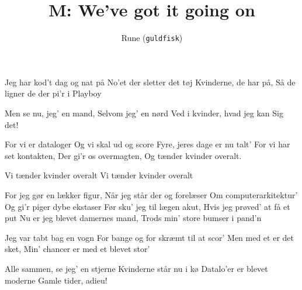 \documentclass[danish]{article}
\title{M: We've got it going on}
\author{Rune (\texttt{guldfisk})}
\begin{document}
\twocolumn[ %
\maketitle
]
\begin{song}

 Jeg har kod't dag og nat på
No'et der sletter det tøj
Kvinderne, de har på,
Så de ligner de der pi'r i Playboy

Men se nu, jeg' en mand,
Selvom jeg' en nørd
Ved i kvinder, hvad jeg kan
Sig det!

For vi er dataloger
Og vi skal ud og score
Fyre, jeres dage er nu talt'
For vi har set kontakten,
Der gi'r os overmagten,
Og tænder kvinder overalt.

Vi tænder kvinder overalt
Vi tænder kvinder overalt

For jeg gør en lækker figur,
Når jeg står der og forelæser
Om computerarkitektur'
Og gi'r piger dybe ekstaser
Før sku' jeg til lægen akut,
Hvis jeg prøved' at få et put
Nu er jeg blevet damernes mand,
Trods min' store bumser i pand'n

Jeg var tabt bag en vogn
For bange og for skræmt til at scor'
Men med et er det sket,
Min' chancer er med et blevet stor'

Alle sammen, se jeg' en stjerne
Kvinderne står nu i kø
Datalo'er er blevet moderne
Gamle tider, adieu!

\end{song}
\end{document}
